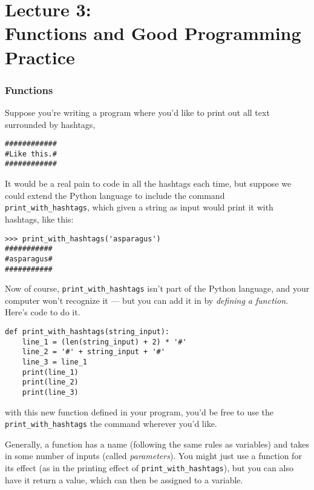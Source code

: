 
\part*{Lecture 3:\\Functions and Good Programming Practice}


\section*{Functions}

Suppose you're writing a program where you'd like to print out all text surrounded by hashtags, 

\begin{verbatim}
############
#Like this.#
############
\end{verbatim}

It would be a real pain to code in all the hashtags each time, but suppose we could extend the Python language to include the command \texttt{print\_with\_hashtags}, which given a string as input would print it with hashtags, like this:

\begin{lstlisting}[numbers=none]
>>> print_with_hashtags('asparagus')
###########
#asparagus#
###########
\end{lstlisting}

Now of course, \texttt{print\_with\_hashtags} isn't part of the Python language, and your computer won't recognize it --- but you can add it in by \emph{defining a function}. Here's code to do it. 

\begin{lstlisting}
def print_with_hashtags(string_input):
	line_1 = (len(string_input) + 2) * '#'
	line_2 = '#' + string_input + '#'
	line_3 = line_1
	print(line_1)
	print(line_2)
	print(line_3)
\end{lstlisting}

with this new function defined in your program, you'd be free to use the\\ \texttt{print\_with\_hashtags} the command wherever you'd like. 

Generally, a function has a name (following the same rules as variables) and takes in some number of inputs (called \emph{parameters}). You might just use a function for its effect (as in the printing effect of \texttt{print\_with\_hashtags}), but you can also have it return a value, which can then be assigned to a variable.


